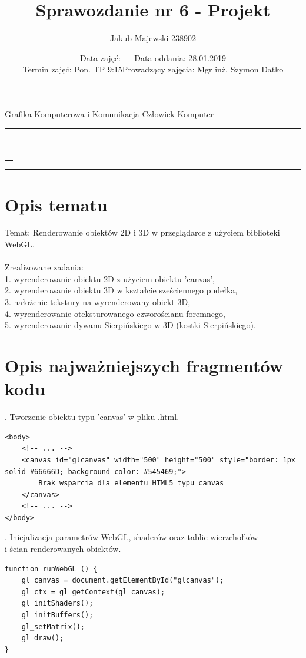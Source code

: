 \documentclass[a4paper,11pt]{article}
\date{
{Data zajęć: --- \hfill Data oddania: 28.01.2019}
\\
{Termin zajęć: Pon. TP 9:15\hfill Prowadzący zajęcia: Mgr inż. Szymon Datko}
}
\title{Sprawozdanie nr 6 - Projekt}
\author{Jakub Majewski 238902}
\makeatletter
\renewcommand{\maketitle}{
   \begin{titlepage}
     \begin{center}
       {\@date}
       \\
       \par\vspace{3ex}
       {\LARGE\@title}
       \par\vspace{1ex}
       \begin{tabular}[t]{c}
         \@author
       \end{tabular}
     \end{center}
     \@thanks
   \end{titlepage}
}
\makeatother
\begin{document}
\begin{center}\Large
    Grafika Komputerowa i Komunikacja Człowiek-Komputer
\end{center}

\hrule
    {\let\newpage\relax\maketitle}
\hrule
 

\section{Opis tematu}

Temat: Renderowanie obiektów 2D i 3D w przeglądarce z użyciem biblioteki WebGL. \\ \\
Zrealizowane zadania: \\
1. wyrenderowanie obiektu 2D z użyciem obiektu 'canvas', \\
2. wyrenderowanie obiektu 3D w kształcie sześciennego pudełka, \\
3. nałożenie tekstury na wyrenderowany obiekt 3D, \\
4. wyrenderowanie oteksturowanego czworościanu foremnego, \\
5. wyrenderowanie dywanu Sierpińskiego w 3D (kostki Sierpińskiego).


\newpage
\section{Opis najważniejszych fragmentów kodu}

. Tworzenie obiektu typu 'canvas' w pliku .html.
\begin{verbatim}
<body>
	<!-- ... -->
	<canvas id="glcanvas" width="500" height="500" style="border: 1px solid #66666D; background-color: #545469;">
		Brak wsparcia dla elementu HTML5 typu canvas 
	</canvas>
	<!-- ... -->
</body>
\end{verbatim}

. Inicjalizacja parametrów WebGL, shaderów oraz tablic wierzchołków \\i ścian renderowanych obiektów.
\begin{verbatim}
function runWebGL () {
	gl_canvas = document.getElementById("glcanvas");
	gl_ctx = gl_getContext(gl_canvas);    
	gl_initShaders();
	gl_initBuffers();
	gl_setMatrix();    
	gl_draw(); 
}
\end{verbatim}
\newpage
\end{document}
